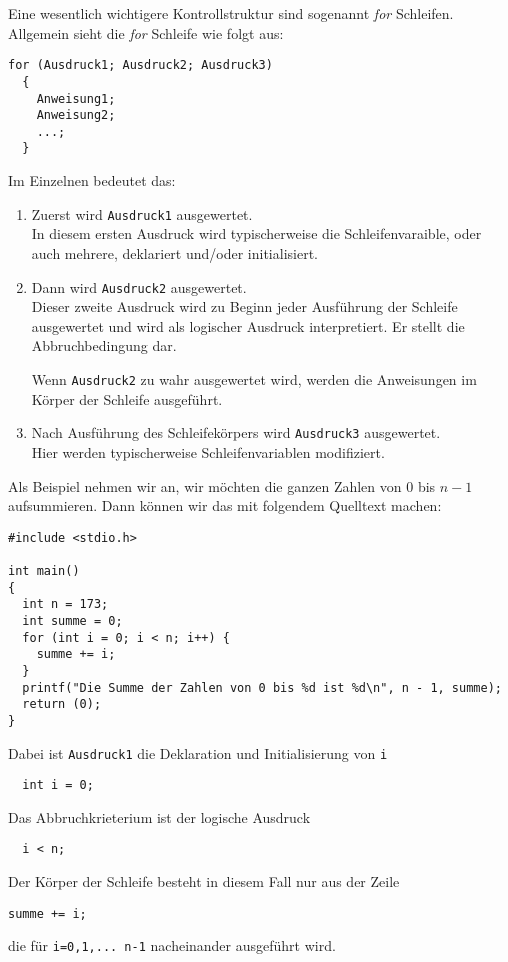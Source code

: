 Eine wesentlich wichtigere Kontrollstruktur sind sogenannt \emph{for} Schleifen.
Allgemein sieht die \emph{for} Schleife wie folgt aus:
\begin{lstlisting}[caption={for Schleife}, belowcaptionskip=0.3em]
for (Ausdruck1; Ausdruck2; Ausdruck3)
  {
    Anweisung1;
    Anweisung2;
    ...;
  }
\end{lstlisting}
Im Einzelnen bedeutet das:
\begin{enumerate}
\item Zuerst wird \texttt{Ausdruck1} ausgewertet.\\
  In diesem ersten Ausdruck wird typischerweise die Schleifenvaraible, oder auch mehrere, deklariert und/oder initialisiert. 
\item Dann wird \texttt{Ausdruck2} ausgewertet.\\
  Dieser zweite Ausdruck wird zu Beginn jeder Ausführung der Schleife ausgewertet und wird als logischer Ausdruck interpretiert.
  Er stellt die Abbruchbedingung dar.

  Wenn \texttt{Ausdruck2} zu wahr ausgewertet wird, werden die Anweisungen im Körper der Schleife ausgeführt. 
\item Nach Ausführung des Schleifekörpers wird \texttt{Ausdruck3} ausgewertet.\\
  Hier werden typischerweise Schleifenvariablen modifiziert.
\end{enumerate}
Als Beispiel nehmen wir an, wir möchten die ganzen Zahlen von $0$ bis $n-1$ aufsummieren.
Dann können wir das mit folgendem Quelltext machen:
\begin{lstlisting}
#include <stdio.h>

int main()
{
  int n = 173;
  int summe = 0;
  for (int i = 0; i < n; i++) {
    summe += i;
  }
  printf("Die Summe der Zahlen von 0 bis %d ist %d\n", n - 1, summe);
  return (0);
}
\end{lstlisting}
Dabei ist \texttt{Ausdruck1} die Deklaration und Initialisierung von \verb|i|
\begin{lstlisting}
  int i = 0;
\end{lstlisting}
Das Abbruchkrieterium ist der logische Ausdruck
\begin{lstlisting}
  i < n;
\end{lstlisting}
Der Körper der Schleife besteht in diesem Fall nur aus der Zeile
\begin{lstlisting}
summe += i;
\end{lstlisting}
die für \verb|i=0,1,... n-1| nacheinander ausgeführt wird.
